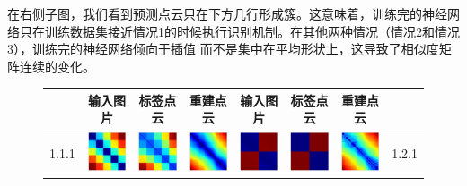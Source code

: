\documentclass[bachelor, nocolorlinks, printoneside]{seuthesis} %
\begin{document}
\begin{Main}
在右侧子图，我们看到预测点云只在下方几行形成簇。这意味着，训练完的神经网络只在训练数据集接近情况1的时候执行识别机制。在其他两种情况（情况2和情况3），训练完的神经网络倾向于插值
而不是集中在平均形状上，这导致了相似度矩阵连续的变化。


\begin{figure}[ht!]
    \begin{centering}
        \begin{tabular}{cccc|cccc}
        \toprule
         &输入图片 & 标签点云 & 重建点云 & 输入图片 & 标签点云 & 重建点云& \\
        \toprule
        1.1.1 &\includegraphics[width=0.12\columnwidth,keepaspectratio]{figs/toyset_matrices/cluster_5by20_1_1.png} &
        \includegraphics[width=0.12\columnwidth,keepaspectratio]{figs/toyset_matrices/cluster_5by20_1_2.png} &
        \includegraphics[width=0.12\columnwidth,keepaspectratio]{figs/toyset_matrices/cluster_5by20_1_3.png} &  
        \includegraphics[width=0.12\columnwidth,keepaspectratio]{figs/toyset_matrices/cluster_2by10_1_1.png} &
        \includegraphics[width=0.12\columnwidth,keepaspectratio]{figs/toyset_matrices/cluster_2by10_1_2.png} &
        \includegraphics[width=0.12\columnwidth,keepaspectratio]{figs/toyset_matrices/cluster_2by10_1_3.png}& 1.2.1\\

\end{tabular}
\end{centering}
\end{figure}
\end{Main}
\end{document}
